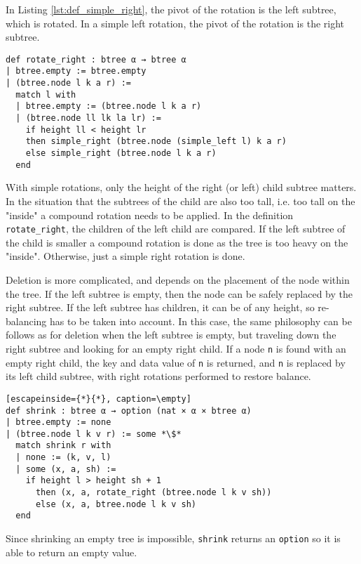 In Listing \ref{lst:def_simple_right}, the pivot of the rotation is the left subtree, which is rotated. In a simple left rotation, the pivot of the rotation is the right subtree.

\begin{lstlisting}[caption=\empty, label={lst:def_rotate_right}]
def rotate_right : btree α → btree α
| btree.empty := btree.empty
| (btree.node l k a r) :=
  match l with
  | btree.empty := (btree.node l k a r)
  | (btree.node ll lk la lr) :=
    if height ll < height lr 
    then simple_right (btree.node (simple_left l) k a r)
    else simple_right (btree.node l k a r)
  end 
\end{lstlisting}

With simple rotations, only the height of the right (or left) child subtree matters. In the situation that the subtrees of the child are also too tall, i.e. too tall on the "inside" a compound rotation needs to be applied. In the definition \lstinline{rotate_right}, the children of the left child are compared. If the left subtree of the child is smaller a compound rotation is done as the tree is too heavy on the "inside". Otherwise, just a simple right rotation is done.

Deletion is more complicated, and depends on the placement of the node within the tree. If the left subtree is empty, then the node can be safely replaced by the right subtree.  If the left subtree has children, it can be of any height, so re-balancing has to be taken into account. In this case, the same philosophy can be follows as for deletion when the left subtree is empty, but traveling down the right subtree and looking for an empty right child. If a node \lstinline{n} is found with an empty right child, the key and data value of \lstinline{n} is returned, and \lstinline{n} is replaced by its left child subtree, with right rotations performed to restore balance. 

\begin{lstlisting}[escapeinside={*}{*}, caption=\empty]
def shrink : btree α → option (nat × α × btree α)
| btree.empty := none
| (btree.node l k v r) := some *\$*
  match shrink r with
  | none := (k, v, l)
  | some (x, a, sh) :=
    if height l > height sh + 1
      then (x, a, rotate_right (btree.node l k v sh))
      else (x, a, btree.node l k v sh)
  end
\end{lstlisting}

Since shrinking an empty tree is impossible, \lstinline{shrink} returns an \lstinline{option} so it is able to return an empty value.

